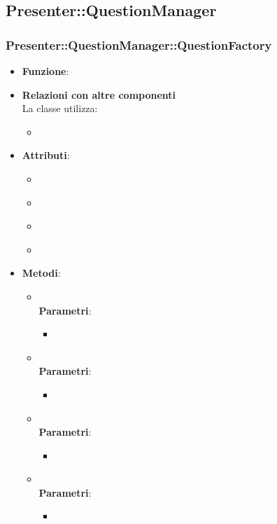 \subsection{Presenter::QuestionManager}
\subsubsection{Presenter::QuestionManager::QuestionFactory}
\begin{itemize}
\item\textbf{Funzione}:
\item\textbf{Relazioni con altre componenti}\\
La classe utilizza:
	\begin{itemize}
		\item
	\end{itemize}
\item\textbf{Attributi}:
	\begin{itemize}
		\item\code{}\\
		\item\code{}\\
		\item\code{}\\
		\item\code{}\\
	\end{itemize}
\item\textbf{Metodi}:
	\begin{itemize}
		\item\code{}\\
		\textbf{Parametri}:
			\begin{itemize}
				\item\code{}\\
			\end{itemize}
		\item\code{}\\
		\textbf{Parametri}:
			\begin{itemize}
				\item\code{}\\
			\end{itemize}
		\item\code{}\\
		\textbf{Parametri}:
			\begin{itemize}
				\item\code{}\\
			\end{itemize}
		\item\code{}\\
		\textbf{Parametri}:
			\begin{itemize}
				\item\code{}\\
			\end{itemize}
	\end{itemize}
\end{itemize}

